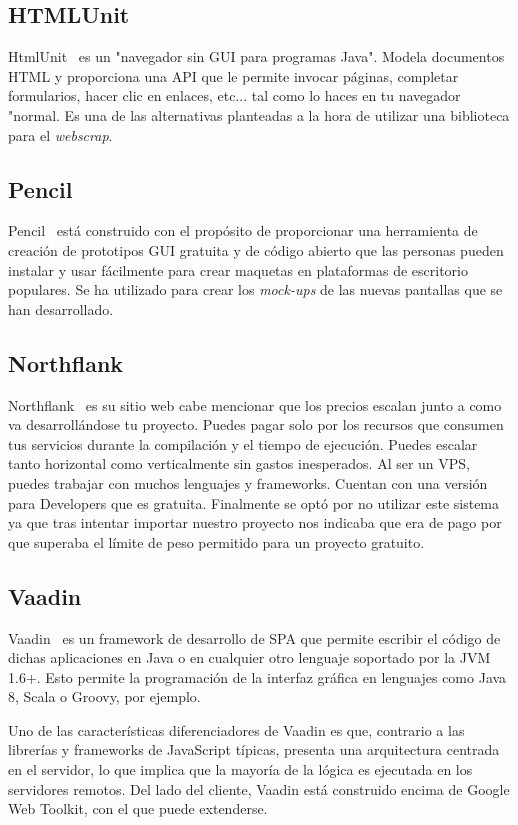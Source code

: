 \subsection{HTMLUnit}
HtmlUnit~\cite{HTMLUNIT} es un "navegador sin GUI para programas Java". Modela documentos HTML y proporciona una API que le permite invocar páginas, completar formularios, hacer clic en enlaces, etc... tal como lo haces en tu navegador "normal. 
Es una de las alternativas planteadas a la hora de utilizar una biblioteca para el \emph{webscrap}.

\subsection{Pencil}
Pencil~\cite{Pencil_project} está construido con el propósito de proporcionar una herramienta de creación de prototipos GUI gratuita y de código abierto que las personas pueden instalar y usar fácilmente para crear maquetas en plataformas de escritorio populares. 
Se ha utilizado para crear los \emph{mock-ups} de las nuevas pantallas que se han desarrollado.

\subsection{Northflank}
Northflank~\cite{Northflank} es su sitio web cabe mencionar que los precios escalan junto a como va desarrollándose tu proyecto. Puedes pagar solo por los recursos que consumen tus servicios durante la compilación y el tiempo de ejecución. Puedes escalar tanto horizontal como verticalmente sin gastos inesperados. Al ser un VPS, puedes trabajar con muchos lenguajes y frameworks. Cuentan con una versión para Developers que es gratuita. 
Finalmente se optó por no utilizar este sistema ya que tras intentar importar nuestro proyecto nos indicaba que era de pago por que superaba el límite de peso permitido para un proyecto gratuito.

\subsection{Vaadin}
Vaadin~\cite{Vaadin} es un framework de desarrollo de SPA que permite escribir el código de dichas aplicaciones en Java o en cualquier otro lenguaje soportado por la JVM 1.6+. Esto permite la programación de la interfaz gráfica en lenguajes como Java 8, Scala o Groovy, por ejemplo.

Uno de las características diferenciadores de Vaadin es que, contrario a las librerías y frameworks de JavaScript típicas, presenta una arquitectura centrada en el servidor, lo que implica que la mayoría de la lógica es ejecutada en los servidores remotos. Del lado del cliente, Vaadin está construido encima de Google Web Toolkit, con el que puede extenderse.


